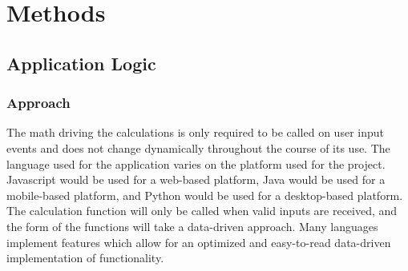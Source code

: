 \documentclass[onecolumn, draftclsnofoot,10pt, compsoc]{IEEEtran}
\begin{document}
\section{Methods}

\subsection{Application Logic}
\subsubsection{Approach}
The math driving the calculations is only required to be called on user input events and does not change dynamically throughout the course of its use.
The language used for the application varies on the platform used for the project.
Javascript would be used for a web-based platform, Java would be used for a mobile-based platform, and Python would be used for a desktop-based platform.
The calculation function will only be called when valid inputs are received, and the form of the functions will take a data-driven approach.
Many languages implement features which allow for an optimized and easy-to-read data-driven implementation of functionality.
\end{document}

